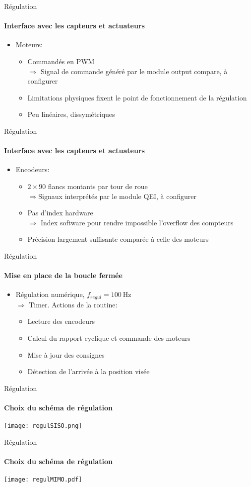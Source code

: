 \begin{frame}
  \tableofcontents[currentsection]
\end{frame}

\begin{frame}{Régulation}
\framesubtitle{Interface avec les capteurs et actuateurs}
\begin{itemize}
  \item Moteurs:
  \begin{itemize}
  \item Commandés en PWM\\
  $\Rightarrow$ Signal de commande généré par le module output compare, à configurer
  \item Limitations physiques fixent le point de fonctionnement de la régulation
  \item Peu linéaires, dissymétriques
  \end{itemize}
\end{itemize}
\end{frame}

\begin{frame}{Régulation}
\framesubtitle{Interface avec les capteurs et actuateurs}
\begin{itemize}
  \item Encodeurs:
  \begin{itemize}
    \item $2\times90$ flancs montants par tour de roue\\
    $\Rightarrow$Signaux interprétés par le module QEI, à configurer
    \item Pas d'index hardware\\
    $\Rightarrow$ Index software pour rendre impossible l'overflow des compteurs
    \item Précision largement suffisante comparée à celle des moteurs
  \end{itemize}
\end{itemize}
\end{frame}

\begin{frame}{Régulation}
\framesubtitle{Mise en place de la boucle fermée}
\begin{itemize}
  \item Régulation numérique, $f_{regul} = \SI{100}{\hertz}$\\
  $\Rightarrow$ Timer. Actions de la routine:
  \begin{itemize}
    \item Lecture des encodeurs
    \item Calcul du rapport cyclique et commande des moteurs
    \item Mise à jour des consignes
    \item Détection de l'arrivée à la position visée
  \end{itemize}
\end{itemize}
\end{frame}

\begin{frame}{Régulation}
\framesubtitle{Choix du schéma de régulation}
\texttt{[image: regulSISO.png]}
\end{frame}

\begin{frame}{Régulation}
\framesubtitle{Choix du schéma de régulation}
\texttt{[image: regulMIMO.pdf]}
\end{frame}
